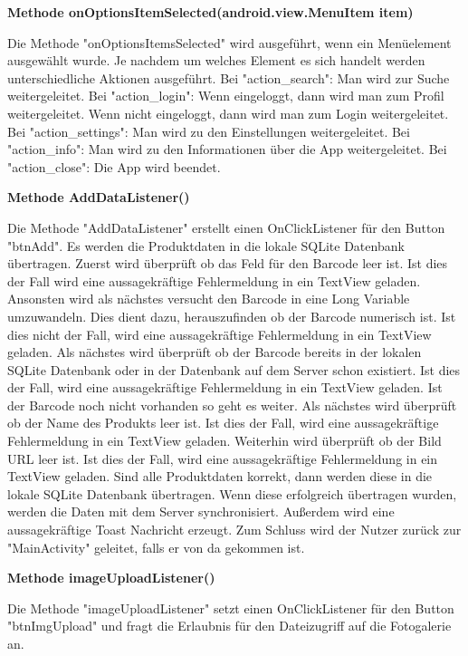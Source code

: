 \documentclass{scrartcl}
\begin{document}
\noindent\textbf{Methode onOptionsItemSelected(android.view.MenuItem item)} 

\noindent Die Methode "onOptionsItemsSelected" wird ausgeführt, wenn ein Menüelement ausgewählt wurde. Je nachdem um welches Element es sich handelt werden unterschiedliche Aktionen ausgeführt. Bei "action\_search": Man wird zur Suche weitergeleitet. Bei "action\_login": Wenn eingeloggt, dann wird man zum Profil weitergeleitet. Wenn nicht eingeloggt, dann wird man zum Login weitergeleitet. Bei "action\_settings": Man wird zu den Einstellungen weitergeleitet. Bei "action\_info": Man wird zu den Informationen über die App weitergeleitet. Bei "action\_close": Die App wird beendet. \newline

\noindent\textbf{Methode AddDataListener()} 

\noindent Die Methode "AddDataListener" erstellt einen OnClickListener für den Button "btnAdd". Es werden die Produktdaten in die lokale SQLite Datenbank übertragen. Zuerst wird überprüft ob das Feld für den Barcode leer ist. Ist dies der Fall wird eine aussagekräftige Fehlermeldung in ein TextView geladen. Ansonsten wird als nächstes versucht den Barcode in eine Long Variable umzuwandeln. Dies dient dazu, herauszufinden ob der Barcode numerisch ist. Ist dies nicht der Fall, wird eine aussagekräftige Fehlermeldung in ein TextView geladen. Als nächstes wird überprüft ob der Barcode bereits in der lokalen SQLite Datenbank oder in der Datenbank auf dem Server schon existiert. Ist dies der Fall, wird eine aussagekräftige Fehlermeldung in ein TextView geladen. Ist der Barcode noch nicht vorhanden so geht es weiter. Als nächstes wird überprüft ob der Name des Produkts leer ist. Ist dies der Fall, wird eine aussagekräftige Fehlermeldung in ein TextView geladen. Weiterhin wird überprüft ob der Bild URL leer ist. Ist dies der Fall, wird eine aussagekräftige Fehlermeldung in ein TextView geladen. Sind alle Produktdaten korrekt, dann werden diese in die lokale SQLite Datenbank übertragen. Wenn diese erfolgreich übertragen wurden, werden die Daten mit dem Server synchronisiert. Außerdem wird eine aussagekräftige Toast Nachricht erzeugt. Zum Schluss wird der Nutzer zurück zur "MainActivity" geleitet, falls er von da gekommen ist.\newline 

\noindent\textbf{Methode imageUploadListener()} 

\noindent Die Methode "imageUploadListener" setzt einen OnClickListener für den Button "btnImgUpload" und fragt die Erlaubnis für den Dateizugriff auf die Fotogalerie an.\newline 
\end{document}
